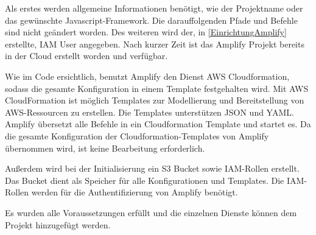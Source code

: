Als erstes werden allgemeine Informationen benötigt, wie der Projektname oder das gewünschte Javascript-Framework.
Die darauffolgenden Pfade und Befehle sind nicht geändert worden.
Des weiteren wird der, in \ref{EinrichtungAmplify}  erstellte, IAM User angegeben.
Nach kurzer Zeit ist das Amplify Projekt bereits in der Cloud erstellt worden und verfügbar.

Wie im Code ersichtlich, benutzt Amplify den Dienst AWS Cloudformation, sodass die gesamte Konfiguration in einem Template festgehalten wird.
Mit AWS CloudFormation ist möglich Templates zur Modellierung und Bereitstellung von AWS-Ressourcen zu erstellen.
Die Templates unterstützen JSON und YAML.
Amplify übersetzt alle Befehle in ein Cloudformation Template und startet es.
Da die gesamte Konfiguration der Cloudformation-Templates von Amplify übernommen wird, ist keine Bearbeitung erforderlich.

Außerdem wird bei der Initialisierung ein S3 Bucket sowie IAM-Rollen erstellt.
Das Bucket dient als Speicher für alle Konfigurationen und Templates.
Die IAM-Rollen werden für die Authentifizierung von Amplify benötigt.

Es wurden alle Voraussetzungen erfüllt und die einzelnen Dienste können dem Projekt hinzugefügt werden.
